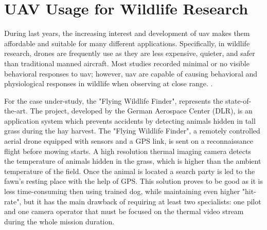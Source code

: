\section{UAV Usage for Wildlife Research} %
\label{sec:state_of_the_art}
 During last years, the increasing interest and development of \acrfull{uav} makes them affordable and suitable for many different applications. Specifically, in wildlife research, drones are frequently use as they are less expensive, quieter, and safer than traditional manned aircraft. Most studies recorded minimal or no visible behavioral responses to \acrshort{uav}; however, \acrshort{uav} are capable of causing behavioral and physiological responses in wildlife when observing at close range. \cite{doi:10.1002/fee.1281}.\par
 For the case under-study, the "Flying Wildlife Finder", represents the state-of-the-art.
 The project, developed by the German Aerospace Center (DLR), is an application system which prevents accidents by detecting animals hidden in tall grass during the hay harvest. 
 The "Flying Wildlife Finder", a remotely controlled aerial drone equipped with sensors and a GPS link, is sent on a reconnaissance flight before mowing starts. A high resolution thermal imaging camera detects the temperature of animals hidden in the grass, which is higher than the ambient temperature of the field. Once the animal is located a search party is led to the fawn’s resting place with the help of GPS.
 This solution proves to be good as it is less time-consuming then using trained dog, while maintaining even higher "hit-rate", but it has the main drawback of requiring at least two specialists: one pilot and one camera operator that must be focused on the thermal video stream during the whole mission duration.

 

